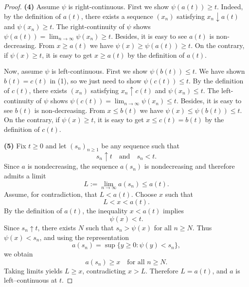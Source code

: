 \documentclass[12pt]{article}
\renewcommand{\(}{\left(}%
\renewcommand{\)}{\right)}%
\renewcommand{\[}{\left[}%
\renewcommand{\]}{\right]}%
\newtheorem{proof}{Proof.}}
\begin{document}
\begin{proof}
\medskip
\noindent \textbf{(4)}
Assume $\psi$ is right-continuous. First we show $\psi(a(t))\geq t$. Indeed, by the definition of $a(t)$, there exists a sequence $(x_n)$ satisfying $x_n\downarrow a(t)$ and $\psi(x_n)\geq t$. The right-continuity of $\psi$ shows $\psi(a(t))=\lim_{n\to\infty}\psi(x_n)\geq t$. Besides, it is easy to see $a(t)$ is non-decreasing. From $x\ge a(t)$ we have $\psi(x)\ge \psi(a(t))\geq t$. On the contrary, if $\psi(x)\geq t$, it is easy to get $x\geq a(t)$ by the definition of $a(t)$.

Now, assume $\psi$ is left-continuous. First we show $\psi(b(t))\leq t$. We have shown $b(t)=c(t)$ in (1), so we just need to show $\psi(c(t))\leq t$. By the definition of $c(t)$, there exists $(x_n)$ satisfying $x_n\uparrow c(t)$ and $\psi(x_n)\leq t$. The left-continuity of $\psi$ shows $\psi(c(t))=\lim_{n\to\infty}\psi(x_n)\leq t$. Besides, it is easy to see $b(t)$ is non-decreasing. From $x\le b(t)$ we have $\psi(x)\le \psi(b(t))\leq t$. On the contrary, if $\psi(x)\geq t$, it is easy to get $x\leq c(t)=b(t)$ by the definition of $c(t)$.

\medskip
\noindent \textbf{(5)}
Fix $t\ge 0$ and let $(s_n)_{n\ge1}$ be any sequence such that
\begin{equation*}
s_n\uparrow t \quad\text{and}\quad s_n<t.
\end{equation*}
Since $a$ is nondecreasing, the sequence $a(s_n)$ is nondecreasing and therefore
admits a limit
\begin{equation*}
L:=\lim_{n\to\infty} a(s_n)\le a(t).
\end{equation*}
Assume, for contradiction, that $L<a(t)$.
Choose $x$ such that
\begin{equation*}
L<x<a(t).
\end{equation*}
By the definition of $a(t)$, the inequality $x<a(t)$ implies
\begin{equation*}
\psi(x)<t.
\end{equation*}
Since $s_n\uparrow t$, there exists $N$ such that $s_n>\psi(x)$ for all $n\ge N$.
Thus $\psi(x)<s_n$, and using the representation
\begin{equation*}
a(s_n)=\sup\{y\ge 0:\psi(y)<s_n\},
\end{equation*}
we obtain
\begin{equation*}
a(s_n)\ge x \quad\text{for all } n\ge N.
\end{equation*}
Taking limits yields $L\ge x$, contradicting $x>L$.
Therefore $L=a(t)$, and $a$ is left--continuous at $t$.


\end{proof}
\end{document}
